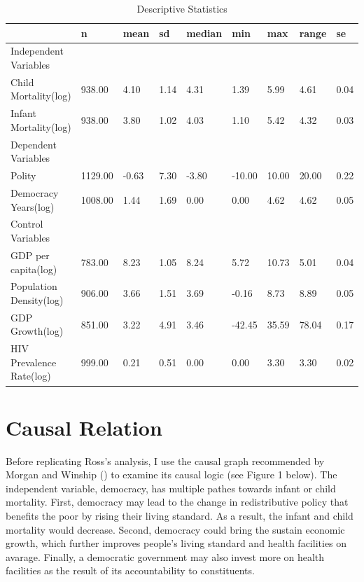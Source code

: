 \documentclass[12pt, lelterpaper, reqno]{article}\usepackage[]{graphicx}\usepackage[]{color}
\begin{document}
\begin{table}[H]
	\centering
	\caption{Descriptive Statistics}
	\begin{tabular}{lllllllll}
		\hline
		& n & mean & sd & median & min & max & range & se \\
		\hline
		Independent Variables &&&&&&&&\\
		\hline
		Child Mortality(log) & 938.00 & 4.10 & 1.14 & 4.31 & 1.39 & 5.99 & 4.61 & 0.04 \\
		Infant Mortality(log) & 938.00 & 3.80 & 1.02 & 4.03 & 1.10 & 5.42 & 4.32 & 0.03 \\
		\hline
		Dependent Variables &&&&&&&&\\
		\hline
		Polity & 1129.00 & -0.63 & 7.30 & -3.80 & -10.00 & 10.00 & 20.00 & 0.22 \\
		Democracy Years(log) & 1008.00 & 1.44 & 1.69 & 0.00 & 0.00 & 4.62 & 4.62 & 0.05 \\
		\hline
		Control Variables &&&&&&&&\\
		\hline
		GDP per capita(log) & 783.00 & 8.23 & 1.05 & 8.24 & 5.72 & 10.73 & 5.01 & 0.04 \\
		Population Density(log) & 906.00 & 3.66 & 1.51 & 3.69 & -0.16 & 8.73 & 8.89 & 0.05 \\
		GDP Growth(log) & 851.00 & 3.22 & 4.91 & 3.46 & -42.45 & 35.59 & 78.04 & 0.17 \\
		HIV Prevalence Rate(log) & 999.00 & 0.21 & 0.51 & 0.00 & 0.00 & 3.30 & 3.30 & 0.02 \\
		\hline
	\end{tabular}
\end{table}

\section{Causal Relation}
Before replicating Ross's analysis, I use the causal graph recommended by Morgan and Winship (\citeyear{morgan2014counterfactuals}) to examine its causal logic (see Figure 1 below). The independent variable, democracy, has multiple pathes towards infant or child mortality. First, democracy may lead to the change in redistributive policy that benefits the poor by rising their living standard. As a result, the infant and child mortality would decrease. Second, democracy could bring the sustain economic growth, which further improves people's living standard and health facilities on avarage. Finally, a democratic government may also invest more on health facilities as the result of its accountability to constituents.
\end{document}
